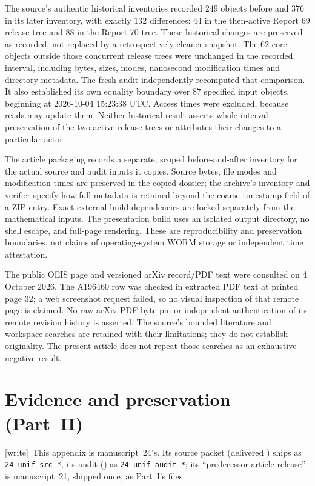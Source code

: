 \documentclass[11pt]{article}
\theoremstyle{definition}
\theoremstyle{remark}
\newcommand{\wtag}{\textup{[write]}}
\begin{document}
The source's authentic historical inventories recorded $249$ objects
before and $376$ in its later inventory, with exactly $132$ differences:
$44$ in the then-active Report 69 release tree and $88$ in the Report 70
tree. These historical changes are preserved as recorded, not replaced
by a retrospectively cleaner snapshot. The $62$ core objects outside
those concurrent release trees were unchanged in the recorded interval,
including bytes, sizes, modes, nanosecond modification times and directory
metadata. The fresh audit independently recomputed that comparison.
It also established its own equality boundary over $87$ specified input
objects, beginning at 2026-10-04 15:23:38 UTC. Access times were excluded,
because reads may update them. Neither historical result asserts
whole-interval preservation of the two active release trees or attributes
their changes to a particular actor.

The article packaging records a separate, scoped before-and-after
inventory for the actual source and audit inputs it copies. Source bytes,
file modes and modification times are preserved in the copied dossier;
the archive's inventory and verifier specify how full metadata is retained
beyond the coarse timestamp field of a ZIP entry. Exact external build
dependencies are locked separately from the mathematical inputs. The
presentation build uses an isolated output directory, no shell escape,
and full-page rendering. These are reproducibility and preservation
boundaries, not claims of operating-system WORM storage or independent
time attestation.

The public OEIS page and versioned arXiv record/PDF text were consulted
on 4 October 2026. The A196460 row was checked in extracted PDF text
at printed page 32; a web screenshot request failed, so no visual
inspection of that remote page is claimed. No raw arXiv PDF byte pin or
independent authentication of its remote revision history is asserted.
The source's bounded literature and workspace searches are retained with
their limitations; they do not establish originality. The present article
does not repeat those searches as an exhaustive negative result.

\section{Evidence and preservation (Part~II)}\label{cta:us:sec:evidence}

\wtag\ This appendix is manuscript~24's. Its source packet (delivered
) ships as \texttt{24-unif-src-*}, its audit
() as \texttt{24-unif-audit-*}; its
``predecessor article release'' is manuscript~21, shipped once, as
Part~I's files.
\end{document}
